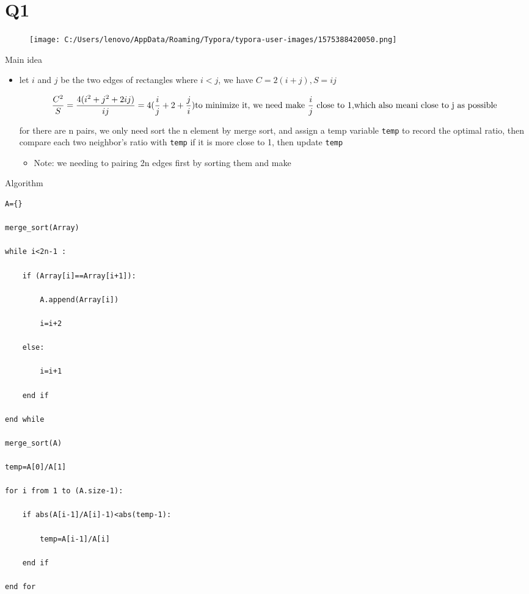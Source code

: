 \documentclass[]{article}
\date{}
\begin{document}
\section{Q1}\label{header-n0}

\begin{figure}
\centering
\texttt{[image: C:/Users/lenovo/AppData/Roaming/Typora/typora-user-images/1575388420050.png]}
\caption{}
\end{figure}

Main idea

\begin{itemize}
\item
  let \(i\) and \(j\) be the two edges of rectangles where \(i<j\), we
  have \(C=2(i+j),S=ij\)

  \[\frac{C^2}{S}=\frac{4(i^2+j^2+2ij)}{ij}=4(\frac{i}{j}+2+\frac{j}{i})\\
  \text{to minimize it, we need make $\frac{i}{j}$ close to 1,which also meani close to j as possible}\\\]

  for there are n pairs, we only need sort the n element by merge sort,
  and assign a temp variable \texttt{temp} to record the optimal ratio,
  then compare each two neighbor's ratio with \texttt{temp} if it is
  more close to 1, then update \texttt{temp}

  \begin{itemize}
  \item
    Note: we needing to pairing 2n edges first by sorting them and make 
  \end{itemize}
\end{itemize}

Algorithm

\begin{verbatim}
A={}

merge_sort(Array)

while i<2n-1 :

	if (Array[i]==Array[i+1]):

		A.append(Array[i])

		i=i+2

	else:

		i=i+1

	end if 

end while

merge_sort(A)

temp=A[0]/A[1]

for i from 1 to (A.size-1):

	if abs(A[i-1]/A[i]-1)<abs(temp-1):

    	temp=A[i-1]/A[i]

    end if 

end for
\end{verbatim}
\end{document}
